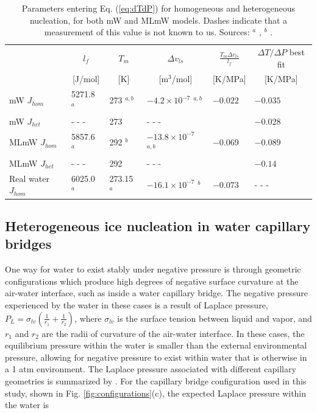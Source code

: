\documentclass[journal abbreviation, manuscript]{copernicus}
\providecommand{\DIFadd}[1]{{\protect\color{blue}\uwave{#1}}} %
\providecommand{\DIFdel}[1]{{\protect\color{red}\sout{#1}}}                      %
\providecommand{\DIFaddbegin}{} %
\providecommand{\DIFaddend}{} %
\providecommand{\DIFdelbegin}{} %
\providecommand{\DIFdelend}{} %
\begin{document}
\begin{table}
\begin{tabular}{ |p{2.60cm}||p{2.2cm}|p{2.2cm}|p{2.2cm}|p{2.2cm}|p{2.5cm}|  }
 \hline
 & \multicolumn{1}{|c|}{$l_f$}  
 & \multicolumn{1}{|c|}{$T_m$}
 & \multicolumn{1}{|c|}{$\Delta v_{ls}$}
 & \multicolumn{1}{|c|}{$\frac{T_m \Delta v_{ls}}{l_f}$ } 
 & \multicolumn{1}{|c|}{$\Delta T/ \Delta P$ best fit }\\
 & \multicolumn{1}{|c|}{[J/mol] }  
 & \multicolumn{1}{|c|}{[K] }
 & \multicolumn{1}{|c|}{[m$^3$/mol]  }        
 & \multicolumn{1}{|c|}{[K/MPa] }                           
 & \multicolumn{1}{|c|}{[K/MPa] }\\
 \hline
 mW $J_{hom}$   & 5271.8 $^a$           & 273 $^{a,b}$  &  $-4.2 \times 10^{-7}$ $^{a,b}$     & $-0.022$    & $-0.035$ \\
 mW $J_{het}$   & - - -   & 273           & - - -   &           & $-0.028$ \\
 MLmW $J_{hom}$ & 5857.6 $^a$           & 292 $^b$      & $-13.8 \times 10^{-7}$ $^{a,b}$     & $-0.069$    & $-0.089$ \\
 MLmW $J_{het}$ & - - -   & 292           & - - -   &           & $-0.14$ \\
 Real water $J_{hom}$ & 6025.0 $^a$     & 273.15 $^a$   & $-16.1 \times 10^{-7}$ $^{b}$       & $-0.073$    & - - - \\
 \hline
\end{tabular}
\caption{\label{tab:slopes} Parameters entering Eq. (\ref{eq:dTdP}) for homogeneous and heterogeneous nucleation, for both mW and MLmW models. Dashes indicate that a measurement of this value is not known to us. Sources: $^a$ \citet{chan2019}, $^b$ \citet{rosky2022}.}
\end{table}




\subsection{Heterogeneous ice nucleation in water capillary bridges} \label{capillary}

One way for water to exist stably under negative pressure is through geometric configurations which produce high degrees of negative surface curvature at the air-water interface, such as inside a water capillary bridge. The negative pressure experienced by the water in these cases is a result of Laplace pressure, \DIFdelbegin \DIFdel{$P_L = \sigma_{lv}(\frac{1}{r_1}+\frac{1}{r_2})$}\DIFdelend \DIFaddbegin \DIFadd{$P = \sigma_{lv}(\frac{1}{r_1}+\frac{1}{r_2})$}\DIFaddend , where $\sigma_{lv}$ is the surface tension between liquid and vapor, and $r_1$ and $r_2$ are the radii of curvature of the air-water interface. In these cases, the equilibrium pressure within the water is smaller than the external environmental pressure, allowing for negative pressure to exist within water that is otherwise in a 1 atm environment. The Laplace pressure associated with different capillary geometries is summarized by \citet{elliott2021}. For the capillary bridge configuration used in this study, shown in Fig. \ref{fig:configurations}(c), the expected Laplace pressure within the water is
\end{document}
